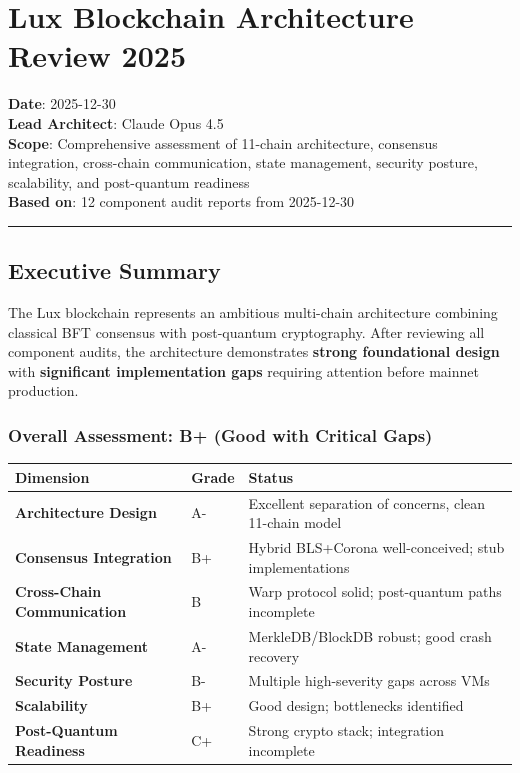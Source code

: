 \documentclass[
]{article}
\author{}
\date{}
\newcounter{none} %
\begin{document}
\section{Lux Blockchain Architecture Review
2025}\label{lux-blockchain-architecture-review-2025}

\textbf{Date}: 2025-12-30\\
\textbf{Lead Architect}: Claude Opus 4.5\\
\textbf{Scope}: Comprehensive assessment of 11-chain architecture,
consensus integration, cross-chain communication, state management,
security posture, scalability, and post-quantum readiness\\
\textbf{Based on}: 12 component audit reports from 2025-12-30

\begin{center}\rule{0.5\linewidth}{0.5pt}\end{center}

\subsection{Executive Summary}\label{executive-summary}

The Lux blockchain represents an ambitious multi-chain architecture
combining classical BFT consensus with post-quantum cryptography. After
reviewing all component audits, the architecture demonstrates
\textbf{strong foundational design} with \textbf{significant
implementation gaps} requiring attention before mainnet production.

\subsubsection{\texorpdfstring{Overall Assessment: \textbf{B+} (Good
with Critical
Gaps)}{Overall Assessment: B+ (Good with Critical Gaps)}}\label{overall-assessment-b-good-with-critical-gaps}

{\def\LTcaptype{none} %
\begin{longtable}[]{@{}lll@{}}
\toprule\noalign{}
Dimension & Grade & Status \\
\midrule\noalign{}
\endhead
\bottomrule\noalign{}
\endlastfoot
\textbf{Architecture Design} & A- & Excellent separation of concerns,
clean 11-chain model \\
\textbf{Consensus Integration} & B+ & Hybrid BLS+Corona
well-conceived; stub implementations \\
\textbf{Cross-Chain Communication} & B & Warp protocol solid;
post-quantum paths incomplete \\
\textbf{State Management} & A- & MerkleDB/BlockDB robust; good crash
recovery \\
\textbf{Security Posture} & B- & Multiple high-severity gaps across
VMs \\
\textbf{Scalability} & B+ & Good design; bottlenecks identified \\
\textbf{Post-Quantum Readiness} & C+ & Strong crypto stack; integration
incomplete \\
\end{longtable}
}
\end{document}
